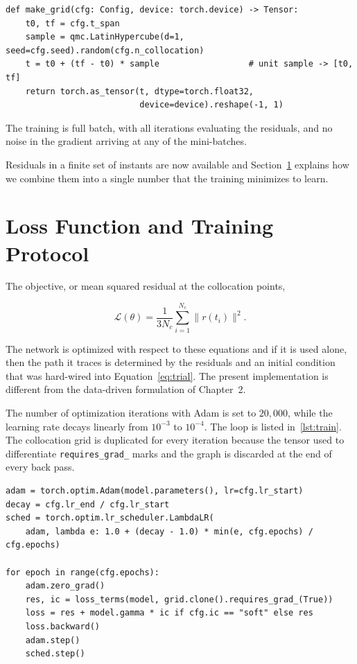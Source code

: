 \begin{lstlisting}[caption={Generating the collocation grid. The sample comes from the unit interval then it was affinely mapped to the solution interval.}, label={lst:collocation}]
def make_grid(cfg: Config, device: torch.device) -> Tensor:
    t0, tf = cfg.t_span
    sample = qmc.LatinHypercube(d=1, seed=cfg.seed).random(cfg.n_collocation)
    t = t0 + (tf - t0) * sample                  # unit sample -> [t0, tf]
    return torch.as_tensor(t, dtype=torch.float32,
                           device=device).reshape(-1, 1)
\end{lstlisting}

The training is full batch, with all iterations evaluating the residuals, and no noise in the gradient arriving at any of the mini-batches.

Residuals in a finite set of instants are now available and Section~\ref{sec:impl_training} explains how we combine them into a single number that the training minimizes to learn. 

\section{Loss Function and Training Protocol}
\label{sec:impl_training}

The objective, or mean squared residual at the collocation points,

\begin{equation}
\mathcal{L}(\theta) = \frac{1}{3N_c} \sum_{i=1}^{N_c} \big\| r(t_i) \big\|^2 .
\label{eq:loss}
\end{equation}

The network is optimized with respect to these equations and if it is used alone, then the path it traces is determined by the residuals and an initial condition that was hard-wired into Equation~\ref{eq:trial}. The present implementation is different from the data-driven formulation of Chapter~2.

The number of optimization iterations with Adam is set to $20{,}000$, while the learning rate decays linearly from $10^{-3}$ to $10^{-4}$. The loop is listed in~\ref{lst:train}. The collocation grid is duplicated for every iteration because the tensor used to differentiate \texttt{requires\_grad\_} marks and the graph is discarded at the end of every back pass.

\begin{lstlisting}[caption={The training loop. \texttt{LambdaLR} on line 3 is linear interpolation started from the beginning and end learning rates across the entire budget.}, label={lst:train}]
adam = torch.optim.Adam(model.parameters(), lr=cfg.lr_start)
decay = cfg.lr_end / cfg.lr_start
sched = torch.optim.lr_scheduler.LambdaLR(
    adam, lambda e: 1.0 + (decay - 1.0) * min(e, cfg.epochs) / cfg.epochs)

for epoch in range(cfg.epochs):
    adam.zero_grad()
    res, ic = loss_terms(model, grid.clone().requires_grad_(True))
    loss = res + model.gamma * ic if cfg.ic == "soft" else res
    loss.backward()
    adam.step()
    sched.step()
\end{lstlisting}

